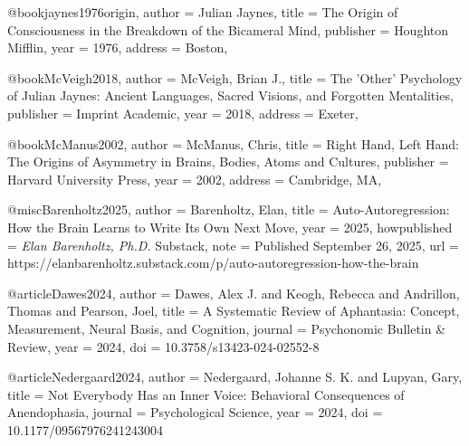 @book{jaynes1976origin,
  author    = {Julian Jaynes},
  title     = {The Origin of Consciousness in the Breakdown of the Bicameral Mind},
  publisher = {Houghton Mifflin},
  year      = {1976},
  address   = {Boston},
}

@book{McVeigh2018,
  author    = {McVeigh, Brian J.},
  title     = {The 'Other' Psychology of Julian Jaynes: Ancient Languages, Sacred Visions, and Forgotten Mentalities},
  publisher = {Imprint Academic},
  year      = {2018},
  address   = {Exeter},
}

@book{McManus2002,
  author    = {McManus, Chris},
  title     = {Right Hand, Left Hand: The Origins of Asymmetry in Brains, Bodies, Atoms and Cultures},
  publisher = {Harvard University Press},
  year      = {2002},
  address   = {Cambridge, MA},
}

@misc{Barenholtz2025,
  author       = {Barenholtz, Elan},
  title        = {Auto-Autoregression: How the Brain Learns to Write Its Own Next Move},
  year         = {2025},
  howpublished = {\emph{Elan Barenholtz, Ph.D.} Substack},
  note         = {Published September 26, 2025},
  url          = {https://elanbarenholtz.substack.com/p/auto-autoregression-how-the-brain}
}

@article{Dawes2024,
  author    = {Dawes, Alex J. and Keogh, Rebecca and Andrillon, Thomas and Pearson, Joel},
  title     = {A Systematic Review of Aphantasia: Concept, Measurement, Neural Basis, and Cognition},
  journal   = {Psychonomic Bulletin \& Review},
  year      = {2024},
  doi       = {10.3758/s13423-024-02552-8}
}

@article{Nedergaard2024,
  author    = {Nedergaard, Johanne S. K. and Lupyan, Gary},
  title     = {Not Everybody Has an Inner Voice: Behavioral Consequences of Anendophasia},
  journal   = {Psychological Science},
  year      = {2024},
  doi       = {10.1177/09567976241243004}
}
